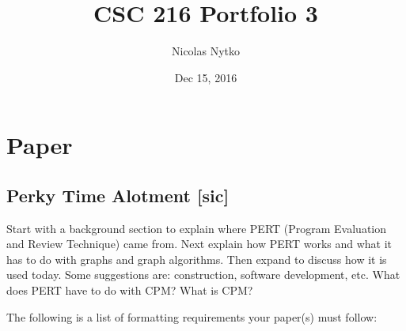 \documentclass{template}
\title{CSC 216 Portfolio 3}
\author{Nicolas Nytko}
\date{Dec 15, 2016}
\begin{document}
\maketitle
\newpage
\tableofcontents
\newpage
\section{Paper}
\subsection{Perky Time Alotment {\footnotesize[sic]}}
Start with a background section to explain where PERT (Program Evaluation and Review Technique) came from. Next explain how PERT works and what it has to do with graphs and graph algorithms. Then expand to discuss how it is used today. Some suggestions are: construction, software development, etc. What does PERT have to do with CPM? What is CPM?

The following is a list of formatting requirements your paper(s) must follow:
 
\end{document}
